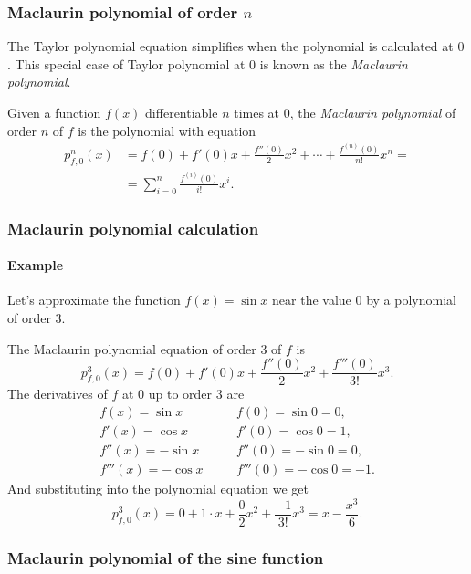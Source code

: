 \begin{frame}
\frametitle{Maclaurin polynomial of order $n$}
The Taylor polynomial equation simplifies when the polynomial is calculated at $0$.
This special case of Taylor polynomial at $0$ is known as the \emph{Maclaurin polynomial}.
\begin{definition}
Given a function $f(x)$ differentiable $n$ times at $0$, the \emph{Maclaurin polynomial} of order $n$ of $f$ is the polynomial with equation
\begin{align*}
p_{f,0}^n(x)&=f(0)+f'(0)x+\frac{f''(0)}{2}x^2+\cdots +\frac{f^{(n)}(0)}{n!}x^n = \\ &=\sum_{i=0}^{n}\frac{f^{(i)}(0)}{i!}x^i.
\end{align*}
\end{definition}
\end{frame}


\begin{frame}
\frametitle{Maclaurin polynomial calculation}
\framesubtitle{Example}
Let's approximate the function $f(x)=\sin x$ near the value $0$ by a polynomial of order $3$.

The Maclaurin polynomial equation of order $3$ of $f$ is
\[
p_{f,0}^3(x)=f(0)+f'(0)x+\frac{f''(0)}{2}x^2+\frac{f'''(0)}{3!}x^3.
\]
The derivatives of $f$ at $0$ up to order $3$ are
\[
\begin{array}{lll}
f(x)=\sin x & \quad & f(0)=\sin 0 =0,\\
f'(x)=\cos x & & f'(0)=\cos 0=1,\\
f''(x)=-\sin x & & f''(0)=-\sin 0=0,\\
f'''(x)=-\cos x & & f'''(0)=-\cos 0=-1.
\end{array}
\]
And substituting into the polynomial equation we get
\[
p_{f,0}^3(x)=0+1\cdot x+\frac{0}{2}x^2+\frac{-1}{3!}x^3= x-\frac{x^3}{6}.
\]
\end{frame}


\begin{frame}
\frametitle{Maclaurin polynomial of the sine function}
\begin{center}

\end{center}
\end{frame}


